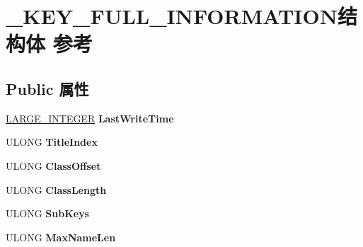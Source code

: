 \hypertarget{struct___k_e_y___f_u_l_l___i_n_f_o_r_m_a_t_i_o_n}{}\section{\+\_\+\+K\+E\+Y\+\_\+\+F\+U\+L\+L\+\_\+\+I\+N\+F\+O\+R\+M\+A\+T\+I\+O\+N结构体 参考}
\label{struct___k_e_y___f_u_l_l___i_n_f_o_r_m_a_t_i_o_n}
\subsection*{Public 属性}
\begin{DoxyCompactItemize}
\item 
\mbox{\label{struct___k_e_y___f_u_l_l___i_n_f_o_r_m_a_t_i_o_n_a57fe6cac73844e0b23f2a155db840b43}} 
\hyperlink{union___l_a_r_g_e___i_n_t_e_g_e_r}{L\+A\+R\+G\+E\+\_\+\+I\+N\+T\+E\+G\+ER} {\bfseries Last\+Write\+Time}
\item 
\mbox{\label{struct___k_e_y___f_u_l_l___i_n_f_o_r_m_a_t_i_o_n_ae505e42cecf1d5752052c70bc59fc258}} 
U\+L\+O\+NG {\bfseries Title\+Index}
\item 
\mbox{\label{struct___k_e_y___f_u_l_l___i_n_f_o_r_m_a_t_i_o_n_ac3f939a5ca2ba37ac6a64dd23d9fff94}} 
U\+L\+O\+NG {\bfseries Class\+Offset}
\item 
\mbox{\label{struct___k_e_y___f_u_l_l___i_n_f_o_r_m_a_t_i_o_n_abffa994ce1dec598306d294e03f9d7a0}} 
U\+L\+O\+NG {\bfseries Class\+Length}
\item 
\mbox{\label{struct___k_e_y___f_u_l_l___i_n_f_o_r_m_a_t_i_o_n_a82597a5253b99adc394eb91dde75a551}} 
U\+L\+O\+NG {\bfseries Sub\+Keys}
\item 
\mbox{\label{struct___k_e_y___f_u_l_l___i_n_f_o_r_m_a_t_i_o_n_ade76d7b9e03154145655f984114f7757}} 
U\+L\+O\+NG {\bfseries Max\+Name\+Len}
\item 
\mbox{\label{struct___k_e_y___f_u_l_l___i_n_f_o_r_m_a_t_i_o_n_af33ef6bfea01ad901b2bee5df6e7aaa7}} 

\end{DoxyCompactItemize}
